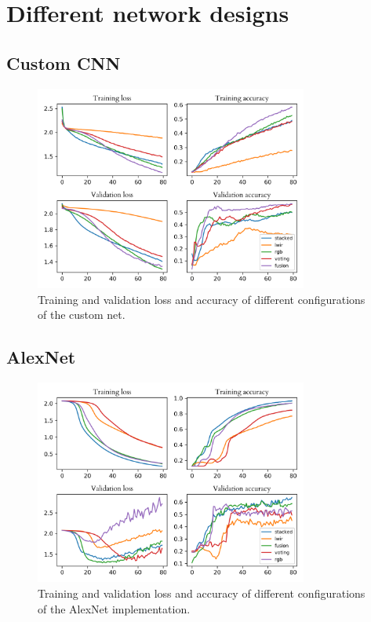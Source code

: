 \documentclass{l4proj}
\begin{document}
\section{Different network designs}

\subsection{Custom CNN}

\begin{figure}[ht]
  \centering
  \includegraphics[width=0.8\textwidth]{images/evaluation/gridsearch/customnet.png}
  \caption{Training and validation loss and accuracy of different configurations of the custom net.}
  \label{fig:customnet_configs}
\end{figure}

\subsection{AlexNet}

\begin{figure}[ht]
  \centering
  \includegraphics[width=0.8\textwidth]{images/evaluation/gridsearch/alexnet.png}
  \caption{Training and validation loss and accuracy of different configurations of the AlexNet implementation.}
  \label{fig:alexnet_configs}
\end{figure}
\end{document}
